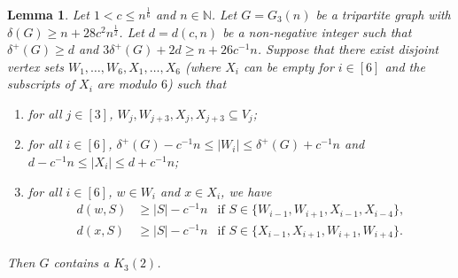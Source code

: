 \documentclass[11pt]{article}
\newtheorem{lemma}[theorem]{Lemma}
\numberwithin{equation}{section}
\begin{document}
	\begin{lemma}\label{lma:C_6-close}
Let $1<c\le n^{\frac{1}{6}}$ and $n\in \mathbb{N}$. %
Let $G=G_3(n)$ be a tripartite graph with $\delta(G)\geq n + 28 c^2 n^{\frac{1}{2}}$. Let $d=d(c,n)$ be a non-negative integer such that $\delta^+(G)\ge d$ and $3\delta^+(G)+2d\ge n+26c^{-1}n$. 
Suppose that there exist disjoint vertex sets $W_1,\dots,W_6,X_1,\dots,X_6$ (where $X_i$ can be empty for $i\in [6]$ and the subscripts of $X_i$ are modulo $6$) such that 
\begin{enumerate}[label = {\rm (\roman*)}]
	\item for all $j \in [3]$, $W_j, W_{j+3},X_{j},X_{j+3} \subseteq V_j$; \label{itm:c6close:2}
	\item for all $i \in [6]$, $\delta^+(G)-c^{-1}n \le |W_i| \le \delta^+(G)+c^{-1}n $ and $d-c^{-1}n \le |X_i| \le d+c^{-1}n $; \label{itm:c6close:1}
	\item 
	\label{itm:c6close:3}
	for all  $ i \in [6]$, $w \in W_i$ and $x \in X_i$, we have 
	\begin{align*}
	d(w,S) & \ge |S|- c^{-1} n & \text{if $S \in \{W_{i-1}, W_{i+1}, X_{i-1}, X_{i-4}\}$},\\
	d(x,S) & \ge |S|- c^{-1} n & \text{if $S \in \{X_{i-1}, X_{i+1}, W_{i+1}, W_{i+4}\}$}.
\end{align*}	
\end{enumerate}
Then $G$ contains a $K_{3}(2)$.
\end{lemma}
\end{document}
